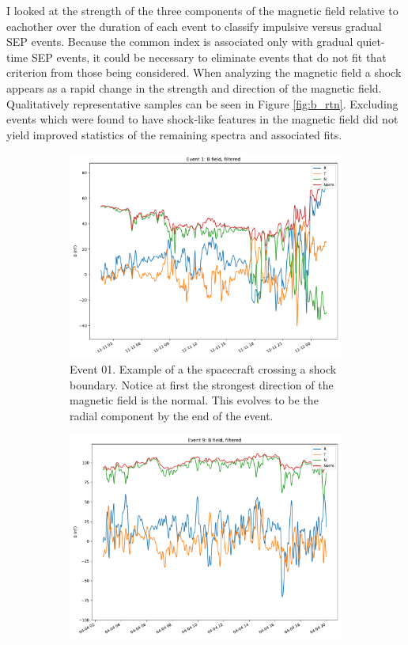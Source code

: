 \documentclass[letterpaper,11pt]{article}
\begin{document}
I looked at the strength of the three components of the magnetic field relative to eachother over the duration of each event to classify impulsive versus gradual SEP events.  Because the common index is associated only with gradual quiet-time SEP events, it could be necessary to eliminate events that do not fit that criterion from those being considered.  When analyzing the magnetic field a shock appears as a rapid change in the strength and direction of the magnetic field.  Qualitatively representative samples can be seen in Figure \ref{fig:b_rtn}.  Excluding events which were found to have shock-like features in the magnetic field did not yield improved statistics of the remaining spectra and associated fits.

\begin{figure}[htbp]
\centering
\begin{subfigure}{0.7\linewidth}
\centering
\includegraphics[width=1.\linewidth]{figures/B_RTN_01.pdf}
\caption{Event 01. Example of a the spacecraft crossing a shock boundary.  Notice at first the strongest direction of the magnetic field is the normal.  This evolves to be the radial component by the end of the event.}
\label{fig:b_rtn_01}
\end{subfigure}
\begin{subfigure}{0.7\linewidth}
\centering
\includegraphics[width=1.\linewidth]{figures/B_RTN_09.pdf}

\end{subfigure}
\end{figure}
\end{document}

